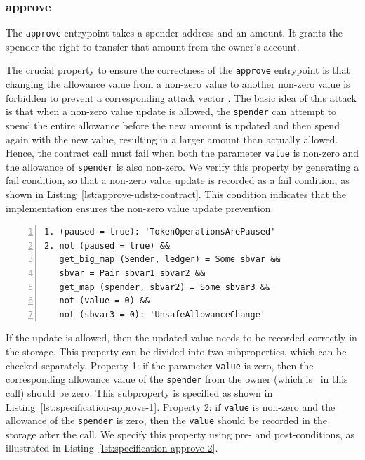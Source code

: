 \documentclass[a4paper,USenglish,cleveref, autoref, thm-restate]{lipics-v2021}
\begin{document}
\subsubsection{approve}
\label{sec:approve}

The \texttt{approve} entrypoint takes a spender address and an
amount. It grants the spender the right to transfer that amount from
the owner's account.

The crucial property to ensure the correctness of the \texttt{approve}
entrypoint is that changing the allowance value from a non-zero value
to another non-zero value is forbidden to prevent a corresponding
attack vector \cite{attack-vector}. The basic idea of this attack is
that when a non-zero value update is allowed, the \lstinline/spender/
can attempt to spend the entire allowance before the new amount is
updated and then spend again with the new value, resulting in a larger
amount than actually allowed. Hence, the contract call must fail when
both the parameter \lstinline/value/ is non-zero and the allowance of
\lstinline/spender/ is also non-zero. We verify this property by
generating a fail condition, so that a non-zero value update is
recorded as a fail condition, as shown in
Listing~\ref{lst:approve-udstz-contract}. This condition indicates
that the implementation ensures the non-zero value update prevention. 
\begin{lstlisting}[float=tp,captionpos=b,caption={Fail conditions for the \lstinline/approve/ entrypoint},label={lst:approve-udstz-contract},numbers=left]
1. (paused = true): 'TokenOperationsArePaused'
2. not (paused = true) &&
   get_big_map (Sender, ledger) = Some sbvar &&
   sbvar = Pair sbvar1 sbvar2 &&
   get_map (spender, sbvar2) = Some sbvar3 &&
   not (value = 0) &&
   not (sbvar3 = 0): 'UnsafeAllowanceChange'
\end{lstlisting}
If the update is allowed, then the updated value needs to be recorded
correctly in the storage. This property can be divided into two
subproperties, which can be checked separately. Property 1: if the
parameter \lstinline/value/ is zero, then the 
corresponding allowance value of the \lstinline/spender/ from the
owner (which is \SENDER\ in this call) should be zero. This
subproperty is specified as shown in
Listing~\ref{lst:specification-approve-1}. Property 2: if
\lstinline/value/ is non-zero and the allowance of the \lstinline/spender/ is zero, then the \lstinline/value/ should be recorded in the storage after the call. We specify this property using pre- and post-conditions, as illustrated in Listing~\ref{lst:specification-approve-2}.
\end{document}
